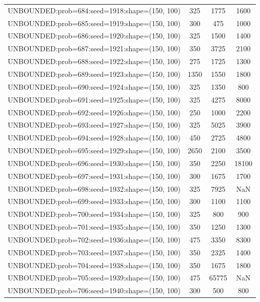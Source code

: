 \begin{longtable}{lccc}
UNBOUNDED:prob=684:seed=1918:shape=(150, 100) &      325 &  1775 &   1600 \\
UNBOUNDED:prob=685:seed=1919:shape=(150, 100) &      300 &   475 &   1000 \\
UNBOUNDED:prob=686:seed=1920:shape=(150, 100) &      325 &  1500 &   1400 \\
UNBOUNDED:prob=687:seed=1921:shape=(150, 100) &      350 &  3725 &   2100 \\
UNBOUNDED:prob=688:seed=1922:shape=(150, 100) &      275 &  1725 &   1300 \\
UNBOUNDED:prob=689:seed=1923:shape=(150, 100) &     1350 &  1550 &   1800 \\
UNBOUNDED:prob=690:seed=1924:shape=(150, 100) &      325 &  1350 &    800 \\
UNBOUNDED:prob=691:seed=1925:shape=(150, 100) &      325 &  4275 &   8000 \\
UNBOUNDED:prob=692:seed=1926:shape=(150, 100) &      250 &  1000 &   2200 \\
UNBOUNDED:prob=693:seed=1927:shape=(150, 100) &      325 &  5025 &   3900 \\
UNBOUNDED:prob=694:seed=1928:shape=(150, 100) &      450 &  2725 &   4800 \\
UNBOUNDED:prob=695:seed=1929:shape=(150, 100) &     2650 &  2100 &   3500 \\
UNBOUNDED:prob=696:seed=1930:shape=(150, 100) &      350 &  2250 &  18100 \\
UNBOUNDED:prob=697:seed=1931:shape=(150, 100) &      300 &  1675 &   1700 \\
UNBOUNDED:prob=698:seed=1932:shape=(150, 100) &      325 &  7925 &    NaN \\
UNBOUNDED:prob=699:seed=1933:shape=(150, 100) &      300 &  1100 &   1100 \\
UNBOUNDED:prob=700:seed=1934:shape=(150, 100) &      325 &   800 &    900 \\
UNBOUNDED:prob=701:seed=1935:shape=(150, 100) &      350 &  1250 &   1300 \\
UNBOUNDED:prob=702:seed=1936:shape=(150, 100) &      475 &  3350 &   8300 \\
UNBOUNDED:prob=703:seed=1937:shape=(150, 100) &      350 &  2325 &   1400 \\
UNBOUNDED:prob=704:seed=1938:shape=(150, 100) &      350 &  1675 &   1800 \\
UNBOUNDED:prob=705:seed=1939:shape=(150, 100) &      475 & 65775 &    NaN \\
UNBOUNDED:prob=706:seed=1940:shape=(150, 100) &      300 &   500 &    800 \\

\end{longtable}
